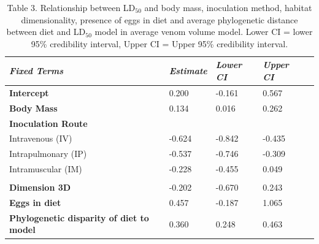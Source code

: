 \begin{table}[H]
  \centering
    \caption[ ]{Table 3. Relationship between LD$_{50}$ and body mass, inoculation method, habitat dimensionality, presence of eggs in diet and average phylogenetic distance between diet and LD$_{50}$ model in average venom volume model. Lower CI = lower 95\% credibility interval, Upper CI = Upper 95\% credibility interval.}
\begin{tabular}{*5l}    \toprule
\emph{Fixed Terms} & \emph{Estimate} & \emph{Lower CI} & \emph{Upper CI}\\\midrule
\textbf{Intercept} & 0.200  &  -0.161 & 0.567 \\ 
\textbf{Body Mass} & 0.134  & 0.016 & 0.262 \\ 
\textbf{Inoculation Route} &  &  &  \\ 
 Intravenous (IV) &  -0.624 &  -0.842 &  -0.435 \\
 Intrapulmonary (IP) &  -0.537 &  -0.746 &  -0.309 \\ 
 Intramuscular (IM) &  -0.228 &  -0.455 & 0.049 \\
  &  &  &  \\ 
\textbf{Dimension 3D} &  -0.202 &  -0.670 & 0.243 \\ 
\textbf{Eggs in diet} & 0.457 &  -0.187 & 1.065 \\ 
\textbf{Phylogenetic disparity of diet to model} & 0.360 & 0.248 & 0.463 \\\bottomrule
 \hline
\end{tabular}
  \label{tbl:Table 3.}
\end{table}






